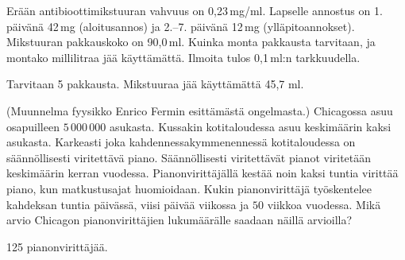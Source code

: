 \begin{tehtavasivu}
\begin{tehtava}
Erään antibioottimikstuuran vahvuus on 0,23\,mg/ml. Lapselle annostus on 1. päivänä 42\,mg (aloitusannos) 
ja 2.--7. päivänä 12\,mg (ylläpitoannokset). Mikstuuran pakkauskoko on 90,0\,ml. Kuinka monta pakkausta tarvitaan, ja montako millilitraa jää käyttämättä. Ilmoita tulos 0,1\,ml:n tarkkuudella.
 \begin{vastaus}
 Tarvitaan 5 pakkausta. Mikstuuraa jää käyttämättä 45,7 ml.
 \end{vastaus}
\end{tehtava}

\begin{tehtava}
(Muunnelma fyysikko Enrico Fermin esittämästä ongelmasta.) Chicagossa asuu osapuilleen
$5\,000\,000$ asukasta. Kussakin kotitaloudessa asuu keskimäärin kaksi asukasta.
Karkeasti joka kahdennessakymmenennessä kotitaloudessa on säännöllisesti viritettävä piano.
Säännöllisesti viritettävät pianot viritetään keskimäärin kerran vuodessa.
Pianonvirittäjällä kestää noin kaksi tuntia virittää piano, kun matkustusajat huomioidaan.
Kukin pianonvirittäjä työskentelee kahdeksan tuntia päivässä, viisi päivää viikossa
ja $50$ viikkoa vuodessa. Mikä arvio Chicagon pianonvirittäjien lukumäärälle saadaan näillä
arvioilla?
\begin{vastaus}
125 pianonvirittäjää.
\end{vastaus}
\end{tehtava}

\end{tehtavasivu}
